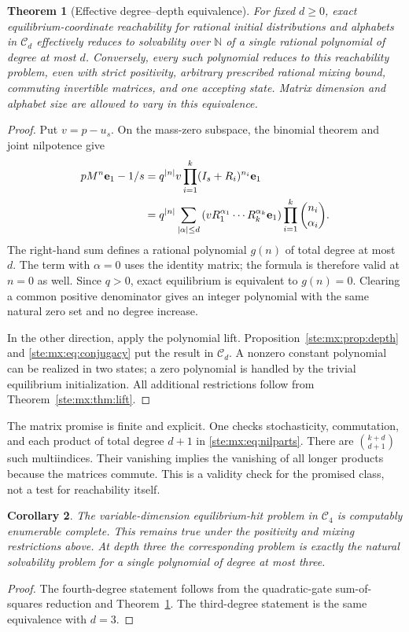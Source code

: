 \documentclass[11pt,letterpaper]{article}
\newtheorem{theorem}{Theorem}[section]
\newtheorem{corollary}[theorem]{Corollary}
\theoremstyle{definition}
\theoremstyle{remark}
\newcommand{\N}{\mathbb N}
\newcommand{\e}{\mathbf e}
\begin{document}
\begin{theorem}[Effective degree--depth equivalence]\label{ste:mx:thm:converse}
For fixed $d\geq0$, exact equilibrium-coordinate reachability for rational
initial distributions and alphabets in $\mathcal C_d$ effectively reduces to
solvability over $\N$ of a single rational polynomial of degree at most $d$.
Conversely, every such polynomial reduces to this reachability problem, even
with strict positivity, arbitrary prescribed rational mixing bound, commuting
invertible matrices, and one accepting state. Matrix dimension and alphabet
size are allowed to vary in this equivalence.
\end{theorem}
\begin{proof}
Put $v=p-u_s$. On the mass-zero subspace, the binomial theorem and joint
nilpotence give
\begin{align}
 pM^n\e_1-1/s
 &=q^{|n|}v\prod_{i=1}^k(I_s+R_i)^{n_i}\e_1\notag\\
 &=q^{|n|}\sum_{|\alpha|\leq d}
       \left(vR_1^{\alpha_1}\cdots R_k^{\alpha_k}\e_1\right)
       \prod_{i=1}^k\binom{n_i}{\alpha_i}.\label{ste:mx:eq:recover}
\end{align}
The right-hand sum defines a rational polynomial $g(n)$ of total degree at
most $d$. The term with $\alpha=0$ uses the identity matrix; the formula is
therefore valid at $n=0$ as well. Since $q>0$, exact equilibrium is equivalent
to $g(n)=0$. Clearing a common positive denominator gives an integer polynomial
with the same natural zero set and no degree increase.

In the other direction, apply the polynomial lift. Proposition~\ref{ste:mx:prop:depth}
and \eqref{ste:mx:eq:conjugacy} put the result in $\mathcal C_d$. A nonzero constant
polynomial can be realized in two states; a zero polynomial is handled by the
trivial equilibrium initialization. All additional restrictions follow from
Theorem~\ref{ste:mx:thm:lift}.
\end{proof}

The matrix promise is finite and explicit. One checks stochasticity,
commutation, and each product of total degree $d+1$ in \eqref{ste:mx:eq:nilparts}.
There are $\binom{k+d}{d+1}$ such multiindices. Their vanishing implies the
vanishing of all longer products because the matrices commute. This is a
validity check for the promised class, not a test for reachability itself.

\begin{corollary}\label{ste:mx:cor:depth4}
The variable-dimension equilibrium-hit problem in $\mathcal C_4$ is computably
enumerable complete. This remains true under the positivity and mixing
restrictions above. At depth three the corresponding problem is exactly the
natural solvability problem for a single polynomial of degree at most three.
\end{corollary}
\begin{proof}
The fourth-degree statement follows from the quadratic-gate sum-of-squares
reduction and Theorem~\ref{ste:mx:thm:converse}. The third-degree statement is the
same equivalence with $d=3$.
\end{proof}
\end{document}
